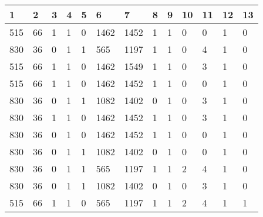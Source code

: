 \begin{table}[H]
\begin{tabular}{|l|l|l|l|l|l|l|l|l|l|l|l|l|}
\hline
\textbf{1} & \textbf{2} & \textbf{3} & \textbf{4} & \textbf{5} & \textbf{6} & \textbf{7} & \textbf{8} & \textbf{9} & \textbf{10} & \textbf{11} & \textbf{12} & \textbf{13} \\ \hline
515        & 66         & 1          & 1          & 0          & 1462       & 1452       & 1          & 1          & 0           & 0           & 1           & 0           \\ \hline
830        & 36         & 0          & 1          & 1          & 565        & 1197       & 1          & 1          & 0           & 4           & 1           & 0           \\ \hline
515        & 66         & 1          & 1          & 0          & 1462       & 1549       & 1          & 1          & 0           & 3           & 1           & 0           \\ \hline
515        & 66         & 1          & 1          & 0          & 1462       & 1452       & 1          & 1          & 0           & 0           & 1           & 0           \\ \hline
830        & 36         & 0          & 1          & 1          & 1082       & 1402       & 0          & 1          & 0           & 3           & 1           & 0           \\ \hline
830        & 36         & 1          & 1          & 0          & 1462       & 1452       & 1          & 1          & 0           & 3           & 1           & 0           \\ \hline
830        & 36         & 0          & 1          & 0          & 1462       & 1452       & 1          & 1          & 0           & 0           & 1           & 0           \\ \hline
830        & 36         & 0          & 1          & 1          & 1082       & 1402       & 0          & 1          & 0           & 0           & 1           & 0           \\ \hline
830        & 36         & 0          & 1          & 1          & 565        & 1197       & 1          & 1          & 2           & 4           & 1           & 0           \\ \hline
830        & 36         & 0          & 1          & 1          & 1082       & 1402       & 0          & 1          & 0           & 3           & 1           & 0           \\ \hline
515        & 66         & 1          & 1          & 0          & 565        & 1197       & 1          & 1          & 2           & 4           & 1           & 1           \\ \hline

\end{tabular}
\end{table}
